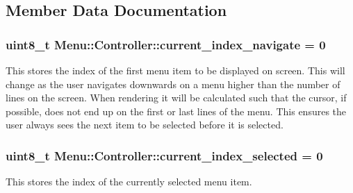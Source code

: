 \subsection{Member Data Documentation}
\subsubsection[{\texorpdfstring{current\+\_\+index\+\_\+navigate}{current_index_navigate}}]{\setlength{\rightskip}{0pt plus 5cm}uint8\+\_\+t Menu\+::\+Controller\+::current\+\_\+index\+\_\+navigate = 0\hspace{0.3cm}{\ttfamily [private]}}\hypertarget{class_menu_1_1_controller_a86055b66afbad89c5a0b8a0a1713f9d3}{}\label{class_menu_1_1_controller_a86055b66afbad89c5a0b8a0a1713f9d3}
This stores the index of the first menu item to be displayed on screen. This will change as the user navigates downwards on a menu higher than the number of lines on the screen. When rendering it will be calculated such that the cursor, if possible, does not end up on the first or last lines of the menu. This ensures the user always sees the next item to be selected before it is selected. 
\subsubsection[{\texorpdfstring{current\+\_\+index\+\_\+selected}{current_index_selected}}]{\setlength{\rightskip}{0pt plus 5cm}uint8\+\_\+t Menu\+::\+Controller\+::current\+\_\+index\+\_\+selected = 0\hspace{0.3cm}{\ttfamily [private]}}\hypertarget{class_menu_1_1_controller_ab3bdee08f22d55f8fa0cb9e29bb27d66}{}\label{class_menu_1_1_controller_ab3bdee08f22d55f8fa0cb9e29bb27d66}
This stores the index of the currently selected menu item. 
